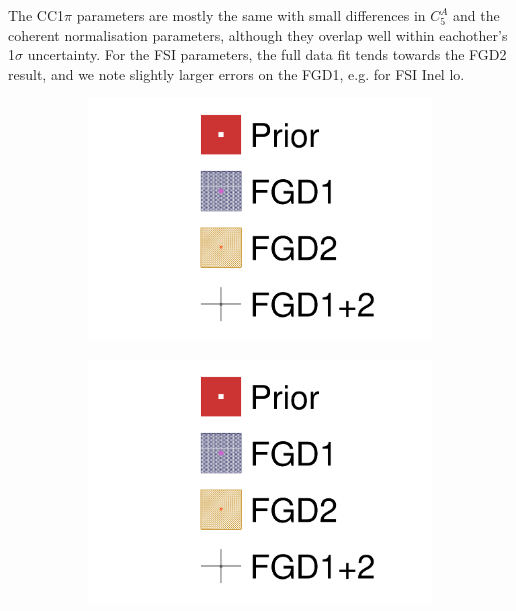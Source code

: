 The CC1$\pi$ parameters are mostly the same with small differences in $C_5^A$ and the coherent normalisation parameters, although they overlap well within eachother's 1$\sigma$ uncertainty. For the FSI parameters, the full data fit tends towards the FGD2 result, and we note slightly larger errors on the FGD1, e.g. for FSI Inel lo.
\begin{figure}[h]
	\begin{subfigure}[t]{0.49\textwidth}
		\includegraphics[width=\textwidth, trim={0mm 0mm 0mm 0mm}, clip,page=18]{figures/mach3/data/alt/2017b_FGD1_Data_merge_2017b_FGD2_Data_merge_2017b_NewData_NewDet_UpdXsecStep_2Xsec_4Det_5Flux_0}
	\end{subfigure}
	\begin{subfigure}[t]{0.49\textwidth}
		\includegraphics[width=\textwidth, trim={0mm 0mm 0mm 0mm}, clip,page=19]{figures/mach3/data/alt/2017b_FGD1_Data_merge_2017b_FGD2_Data_merge_2017b_NewData_NewDet_UpdXsecStep_2Xsec_4Det_5Flux_0}
	\end{subfigure}
	

\end{figure}
